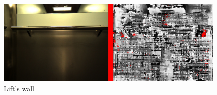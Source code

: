 \documentclass{article}
\begin{document}
\begin{figure}[H]
	\includegraphics[width=\textwidth]{sbgm3}
	\caption{Lift's wall}
\end{figure}
\end{document}
